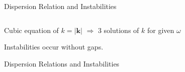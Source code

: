 \documentclass[9pt]{beamer}
\begin{document}
\begin{darkframes}
\begin{frame}{Dispersion Relation and Instabilities}
\begin{columns}[T]
   \end{columns}



\pause
\begin{tcolorbox}[halign=center]
   Cubic equation of $k=\lvert \boldsymbol{k} \rvert$ $\Rightarrow$ 3 solutions of $k$ for given $\omega$
\end{tcolorbox}



\pause
   \begin{tcolorbox}
      \centering
         \color{black}Instabilities occur without gaps.
   \end{tcolorbox}



\end{frame}


\begin{frame}{Dispersion Relations and Instabilities}




\end{frame}
\end{darkframes}
\end{document}
